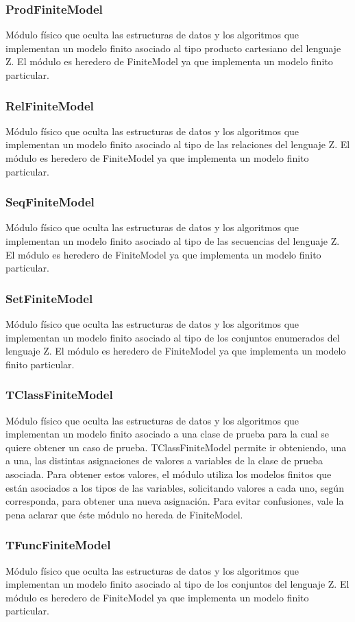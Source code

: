 \documentclass[a4paper,10pt]{report}
\begin{document}
			\subsubsection{ProdFiniteModel}
			Módulo físico que oculta las estructuras de datos y los algoritmos que implementan un modelo finito asociado al tipo producto cartesiano del lenguaje Z. El módulo es heredero de FiniteModel ya que implementa un modelo finito particular.
			\subsubsection{RelFiniteModel}
			Módulo físico que oculta las estructuras de datos y los algoritmos que implementan un modelo finito asociado al tipo de las relaciones del lenguaje Z. El módulo es heredero de FiniteModel ya que implementa un modelo finito particular.
			\subsubsection{SeqFiniteModel}
			Módulo físico que oculta las estructuras de datos y los algoritmos que implementan un modelo finito asociado al tipo de las secuencias del lenguaje Z. El módulo es heredero de FiniteModel ya que implementa un modelo finito particular.
			\subsubsection{SetFiniteModel}
			Módulo físico que oculta las estructuras de datos y los algoritmos que implementan un modelo finito asociado al tipo de los conjuntos enumerados del lenguaje Z. El módulo es heredero de FiniteModel ya que implementa un modelo finito particular.
			\subsubsection{TClassFiniteModel}
			Módulo físico que oculta las estructuras de datos y los algoritmos que implementan un modelo finito asociado a una clase de prueba para la cual se quiere obtener un caso de prueba. TClassFiniteModel permite ir obteniendo, una a una, las distintas asignaciones de valores a variables de la clase de prueba asociada. Para obtener estos valores, el módulo utiliza los modelos finitos que están asociados a los tipos de las variables, solicitando valores a cada uno, según corresponda, para obtener una nueva asignación. Para evitar confusiones, vale la pena aclarar que éste módulo no hereda de FiniteModel.
			\subsubsection{TFuncFiniteModel}
			Módulo físico que oculta las estructuras de datos y los algoritmos que implementan un modelo finito asociado al tipo de los conjuntos del lenguaje Z. El módulo es heredero de FiniteModel ya que implementa un modelo finito particular.
\end{document}
